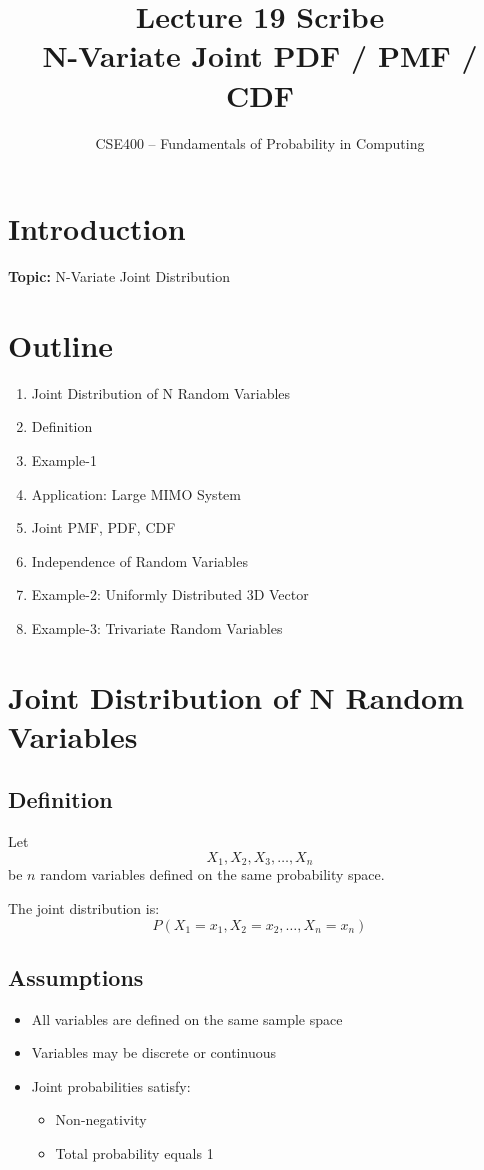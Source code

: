 \documentclass[12pt]{article}
\title{\textbf{Lecture 19 Scribe \\ N-Variate Joint PDF / PMF / CDF}}
\author{CSE400 – Fundamentals of Probability in Computing}
\date{}
\begin{document}
\maketitle

\section*{Introduction}
\textbf{Topic:} N-Variate Joint Distribution

\section*{Outline}
\begin{enumerate}
    \item Joint Distribution of N Random Variables
    \item Definition
    \item Example-1
    \item Application: Large MIMO System
    \item Joint PMF, PDF, CDF
    \item Independence of Random Variables
    \item Example-2: Uniformly Distributed 3D Vector
    \item Example-3: Trivariate Random Variables
\end{enumerate}

\section*{Joint Distribution of N Random Variables}

\subsection*{Definition}
Let
\[
X_1, X_2, X_3, \dots, X_n
\]
be $n$ random variables defined on the same probability space.

The joint distribution is:
\[
P(X_1 = x_1, X_2 = x_2, \dots, X_n = x_n)
\]

\subsection*{Assumptions}
\begin{itemize}
    \item All variables are defined on the same sample space
    \item Variables may be discrete or continuous
    \item Joint probabilities satisfy:
    \begin{itemize}
        \item Non-negativity
        \item Total probability equals 1
    \end{itemize}
\end{itemize}
\end{document}
